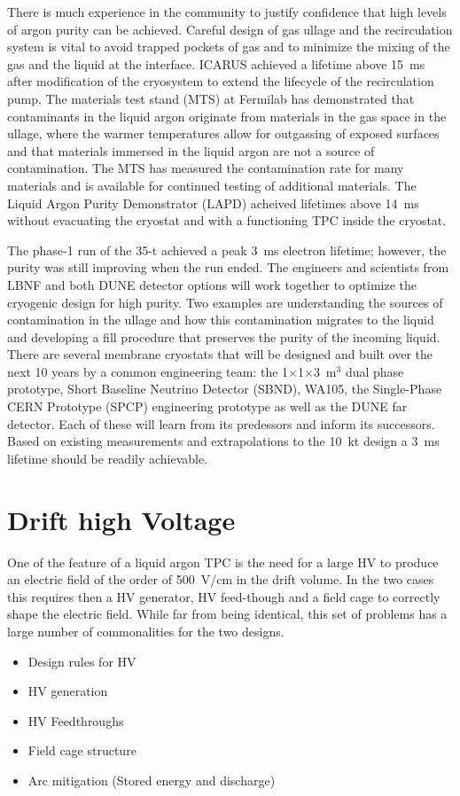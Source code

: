 There is much experience in the community to justify confidence that
high levels of argon purity can be achieved.  Careful design of gas
ullage and the recirculation system is vital to avoid trapped pockets
of gas and to minimize the mixing of the gas and the liquid at the
interface.  ICARUS achieved a lifetime above 15~ms after modification of
the cryosystem to extend the lifecycle of the recirculation
pump.\cite{Antonello:2014eha} The materials test stand (MTS) at Fermilab has
demonstrated that contaminants in the liquid argon originate from
materials in the gas space in the ullage, where the warmer
temperatures allow for outgassing of exposed surfaces and that
materials immersed in the liquid argon are not a source of
contamination.\cite{andrewsNIM} The MTS has measured the
contamination rate for many materials and is available for
continued testing of additional materials.  The Liquid Argon Purity
Demonstrator (LAPD) acheived lifetimes above 14~ms without evacuating
the cryostat and with a functioning TPC inside the
cryostat.\cite{Bromberg:2015uia}


The phase-1 run of the 35-t achieved a peak 3~ms electron lifetime;
however, the purity was still improving when the run ended.  The
engineers and scientists from LBNF and both DUNE detector options will
work together to optimize the cryogenic design for high purity. Two
examples are understanding the sources of contamination in the ullage
and how this contamination migrates to the liquid and developing a
fill procedure that preserves the purity of the incoming liquid.
There are several membrane cryostats that will be designed and built
over the next 10 years by a common engineering team: the
1$\times$1$\times$3~m$^3$ dual phase prototype, Short Baseline
Neutrino Detector (SBND), WA105, the Single-Phase CERN Prototype
(SPCP) engineering prototype as well as the DUNE far detector. Each of
these will learn from its predessors and inform its successors. Based
on existing measurements and extrapolations to the 10~kt design a 3~ms
lifetime should be readily achievable.


\section{Drift high Voltage}

One of the feature of a liquid argon TPC is the need for a large HV to
produce an electric field of the order of 500~V/cm in the drift
volume.  In the two cases this requires then a HV generator, HV
feed-though and a field cage to correctly shape the electric
field. While far from being identical, this set of problems has a
large number of commonalities for the two designs.
\begin{itemize}
\item Design rules for HV
\item HV generation
\item HV Feedthroughs
\item Field cage structure
\item Arc mitigation (Stored energy and discharge)
\end{itemize}


